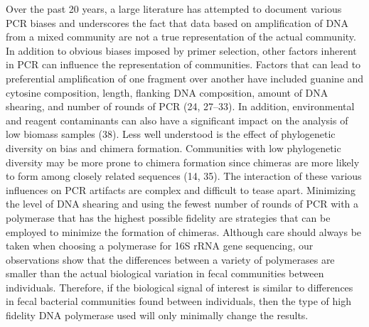 \documentclass[11pt,]{article}
\begin{document}
Over the past 20 years, a large literature has attempted to document
various PCR biases and underscores the fact that data based on
amplification of DNA from a mixed community are not a true
representation of the actual community. In addition to obvious biases
imposed by primer selection, other factors inherent in PCR can influence
the representation of communities. Factors that can lead to preferential
amplification of one fragment over another have included guanine and
cytosine composition, length, flanking DNA composition, amount of DNA
shearing, and number of rounds of PCR (24, 27--33). In addition,
environmental and reagent contaminants can also have a significant
impact on the analysis of low biomass samples (38). Less well understood
is the effect of phylogenetic diversity on bias and chimera formation.
Communities with low phylogenetic diversity may be more prone to chimera
formation since chimeras are more likely to form among closely related
sequences (14, 35). The interaction of these various influences on PCR
artifacts are complex and difficult to tease apart. Minimizing the level
of DNA shearing and using the fewest number of rounds of PCR with a
polymerase that has the highest possible fidelity are strategies that
can be employed to minimize the formation of chimeras. Although care
should always be taken when choosing a polymerase for 16S rRNA gene
sequencing, our observations show that the differences between a variety
of polymerases are smaller than the actual biological variation in fecal
communities between individuals. Therefore, if the biological signal of
interest is similar to differences in fecal bacterial communities found
between individuals, then the type of high fidelity DNA polymerase used
will only minimally change the results.
\end{document}
